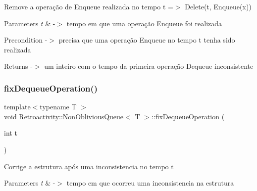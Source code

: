 Remove a operação de Enqueue realizada no tempo t =$>$ Delete(t, Enqueue(x))


\begin{DoxyParams}{Parameters}
{\em t} & -\/$>$ tempo em que uma operação Enqueue foi realizada \\
\hline
\end{DoxyParams}
\begin{DoxyPrecond}{Precondition}
-\/$>$ precisa que uma operação Enqueue no tempo t tenha sido realizada 
\end{DoxyPrecond}
\begin{DoxyReturn}{Returns}
-\/$>$ um inteiro com o tempo da primeira operação Dequeue inconsistente 
\end{DoxyReturn}
\mbox{\label{classRetroactivity_1_1NonObliviousQueue_af5bff7651623702e8b3546a4e5055a5d}} 
\subsubsection{\texorpdfstring{fix\+Dequeue\+Operation()}{fixDequeueOperation()}}
{\footnotesize\ttfamily template$<$typename T $>$ \\
void \hyperlink{classRetroactivity_1_1NonObliviousQueue}{Retroactivity\+::\+Non\+Oblivious\+Queue}$<$ T $>$\+::fix\+Dequeue\+Operation (\begin{DoxyParamCaption}\item[{int}]{t }\end{DoxyParamCaption})}

Corrige a estrutura após uma inconsistencia no tempo t


\begin{DoxyParams}{Parameters}
{\em t} & -\/$>$ tempo em que ocorreu uma inconsistencia na estrutura \\
\hline
\end{DoxyParams}
\mbox{\label{classRetroactivity_1_1NonObliviousQueue_a2ba6cd80f76e1bb99a0b569962be0b9e}} 
